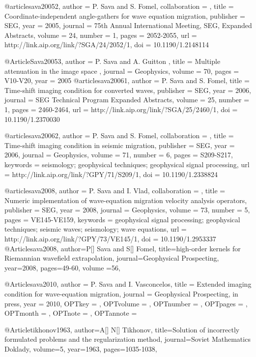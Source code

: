 @article{sava20052,
author = {P. Sava and S. Fomel},
collaboration = {},
title = {Coordinate-independent angle-gathers for wave equation migration},
publisher = {SEG},
year = {2005},
journal = {75th Annual International Meeting, SEG, Expanded Abstracts},
volume = {24},
number = {1},
pages = {2052-2055},
url = {http://link.aip.org/link/?SGA/24/2052/1},
doi = {10.1190/1.2148114}
}

@Article{Sava20053,
  author =	 { P. Sava and A. Guitton },
  title =	 { Multiple attenuation in the image space },
  journal =	 {Geophysics},
  volume =	 70,
  pages =	 {V10-V20},
  year =	 2005
}
@article{sava20061,
  author =	 {P. Sava and S. Fomel},
  title =	 {Time-shift imaging condition for converted waves},
  publisher =	 {SEG},
  year =	 2006,
  journal =	 {SEG Technical Program Expanded Abstracts},
  volume =	 25,
  number =	 1,
  pages =	 {2460-2464},
  url =		 {http://link.aip.org/link/?SGA/25/2460/1},
  doi =		 {10.1190/1.2370030}
}


@article{sava20062,
author = {P. Sava and S. Fomel},
collaboration = {},
title = {Time-shift imaging condition in seismic migration},
publisher = {SEG},
year = {2006},
journal = {Geophysics},
volume = {71},
number = {6},
pages = {S209-S217},
keywords = {seismology; geophysical techniques; geophysical signal processing},
url = {http://link.aip.org/link/?GPY/71/S209/1},
doi = {10.1190/1.2338824}
}

@article{sava2008,
author = {P. Sava and I. Vlad},
collaboration = {},
title = {Numeric implementation of wave-equation migration velocity analysis operators},
publisher = {SEG},
year = {2008},
journal = {Geophysics},
volume = {73},
number = {5},
pages = {VE145-VE159},
keywords = {geophysical signal processing; geophysical techniques; seismic waves; seismology; wave equations},
url = {http://link.aip.org/link/?GPY/73/VE145/1},
doi = {10.1190/1.2953337}
}
@Article{sava2008,
author={P[] Sava and S[] Fomel},
title={high-order kernels for Riemannian wavefield extrapolation},
journal={Geophysical Prospecting},
year=2008,
pages={49-60},
volume ={56},
}

@Article{sava2010,
  author = 	 {P. Sava and I. Vasconcelos},
  title = 	 {Extended imaging condition for wave-equation migration},
  journal = 	 {Geophysical Prospecting, in press},
  year = 	 {2010},
  OPTkey = 	 {},
  OPTvolume = 	 {},
  OPTnumber = 	 {},
  OPTpages = 	 {},
  OPTmonth = 	 {},
  OPTnote = 	 {},
  OPTannote = 	 {}
}



@Article{tikhonov1963,
author={A[] N[] Tikhonov},
title={Solution of incorrectly formulated problems and the regularization method},
journal={Soviet Mathematics Doklady},
volume=5,
year=1963,
pages={1035-1038},
}

